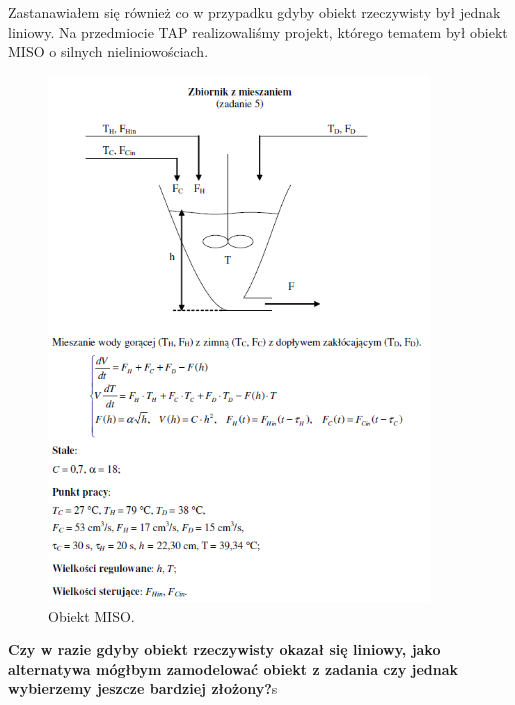 \newpage

Zastanawiałem się również co w przypadku gdyby obiekt rzeczywisty był jednak liniowy. Na przedmiocie TAP realizowaliśmy projekt, którego tematem był obiekt MISO o silnych nieliniowościach.

\begin{figure}[h!]
\centering
\includegraphics[width=0.9\textwidth]{pictures/zadanie_tap}
\caption{Obiekt MISO.}
\end{figure}

\textbf{Czy w razie gdyby obiekt rzeczywisty okazał się liniowy, jako alternatywa mógłbym zamodelować obiekt z zadania czy jednak wybierzemy jeszcze bardziej złożony?}s